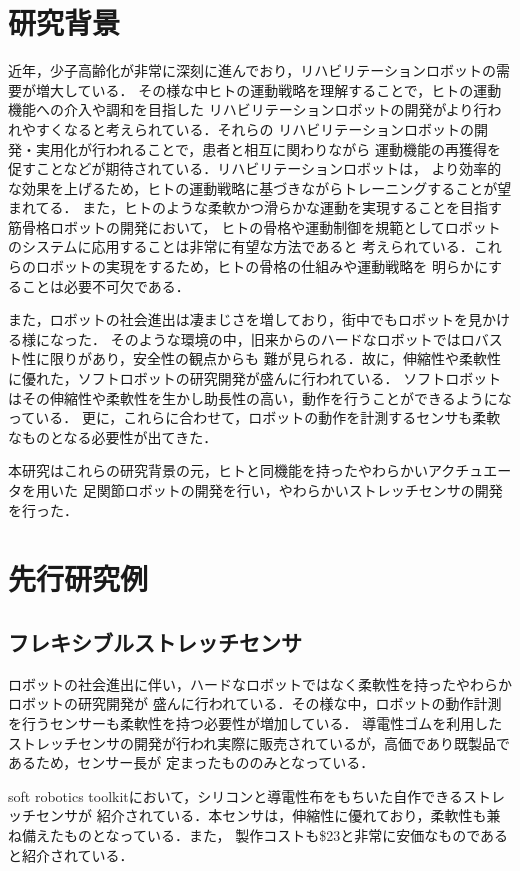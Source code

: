 \section{研究背景}
近年，少子高齢化が非常に深刻に進んでおり，リハビリテーションロボットの需要が増大している．
その様な中ヒトの運動戦略を理解することで，ヒトの運動機能への介入や調和を目指した
リハビリテーションロボットの開発がより行われやすくなると考えられている．それらの
リハビリテーションロボットの開発・実用化が行われることで，患者と相互に関わりながら
運動機能の再獲得を促すことなどが期待されている．リハビリテーションロボットは，
より効率的な効果を上げるため，ヒトの運動戦略に基づきながらトレーニングすることが望まれてる．
また，ヒトのような柔軟かつ滑らかな運動を実現することを目指す筋骨格ロボットの開発において，
ヒトの骨格や運動制御を規範としてロボットのシステムに応用することは非常に有望な方法であると
考えられている．これらのロボットの実現をするため，ヒトの骨格の仕組みや運動戦略を
明らかにすることは必要不可欠である．

また，ロボットの社会進出は凄まじさを増しており，街中でもロボットを見かける様になった．
そのような環境の中，旧来からのハードなロボットではロバスト性に限りがあり，安全性の観点からも
難が見られる．故に，伸縮性や柔軟性に優れた，ソフトロボットの研究開発が盛んに行われている．
ソフトロボットはその伸縮性や柔軟性を生かし助長性の高い，動作を行うことができるようになっている．
更に，これらに合わせて，ロボットの動作を計測するセンサも柔軟なものとなる必要性が出てきた．

本研究はこれらの研究背景の元，ヒトと同機能を持ったやわらかいアクチュエータを用いた
足関節ロボットの開発を行い，やわらかいストレッチセンサの開発を行った．

\section{先行研究例}

\subsection{フレキシブルストレッチセンサ}%
ロボットの社会進出に伴い，ハードなロボットではなく柔軟性を持ったやわらかロボットの研究開発が
盛んに行われている．その様な中，ロボットの動作計測を行うセンサーも柔軟性を持つ必要性が増加している．
導電性ゴムを利用したストレッチセンサの開発が行われ実際に販売されているが，高価であり既製品であるため，センサー長が
定まったもののみとなっている．\cite{bando}

soft robotics toolkit\cite{MITSoftRobot}において，シリコンと導電性布をもちいた自作できるストレッチセンサが
紹介されている．本センサは，伸縮性に優れており，柔軟性も兼ね備えたものとなっている．また，
製作コストも\$23と非常に安価なものであると紹介されている．

